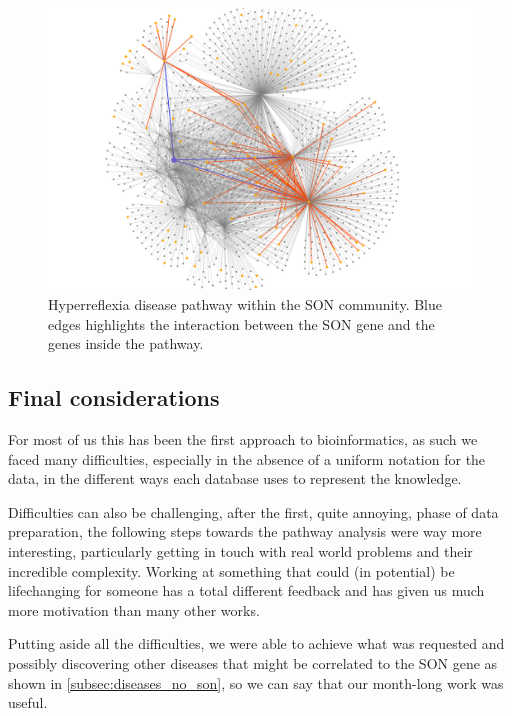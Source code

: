 \begin{figure}[H]
    \centering
    \includegraphics[width=0.8\linewidth]{images/plots/hyperreflexia_NO_SON.png}
    \caption{Hyperreflexia disease pathway within the SON community. Blue edges highlights the interaction between the SON gene and the genes inside the pathway.}
    \label{fig:hyperreflexia_NO_SON}
\end{figure}

\subsection{Final considerations}\label{subsec:final_considerations}
For most of us this has been the first approach to bioinformatics, as such we faced many difficulties, especially in the absence of a uniform notation for the data, in the different ways each database uses to represent the knowledge. 
\vspace{3mm}

Difficulties can also be challenging, after the first, quite annoying, phase of data preparation, the following steps towards the pathway analysis were way more interesting, particularly getting in touch with real world problems and their incredible complexity. Working at something that could (in potential) be lifechanging for someone has a total different feedback and has given us much more motivation than many other works.
\vspace{3mm}

Putting aside all the difficulties, we were able to achieve what was requested and possibly discovering other diseases that might be correlated to the SON gene as shown in \autoref{subsec:diseases_no_son}, so we can say that our month-long work was useful.
